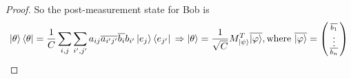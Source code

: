 \begin{proof}
So the post-measurement state for Bob is
\begin{equation}
    \ket{\theta}\bra{\theta}=\frac{1}{C} \sum_{i,j} \sum_{{i'}, {j'}} a_{ij} \overline{a_{i'j'}}\overline{b_i}b_{i'}\ket{e_j}\bra{e_{j'}} \\ \Rightarrow \ket{\theta}=\frac{1}{\sqrt{C}} M_{\ket{\psi}}^T \overline{\ket{\varphi}},
    \text{where } \overline{\ket{\varphi}}=\left(\begin{smallmatrix}\overline{b_1}\\ \vdots \\ \overline{b_n}\end{smallmatrix}\right)
\end{equation}



\end{proof}

